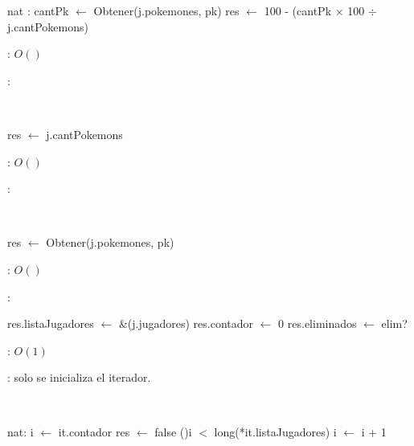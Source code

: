 \begin{Algoritmos}
	\begin{algorithm}[H]
		\NoCaptionOfAlgo
		\caption{}
		nat : cantPk $\leftarrow$ Obtener(j.pokemones, pk)\;
		res $\leftarrow$ 100 - (cantPk $\times$ 100 $\div$ j.cantPokemons)\;
	\end{algorithm}

	\complejidad: $O()$

	\justifcomp:

	~

	\begin{algorithm}[H]
		\NoCaptionOfAlgo
		\caption{}
		res $\leftarrow$ j.cantPokemons\;
	\end{algorithm}

	\complejidad: $O()$

	\justifcomp:

	~

	\begin{algorithm}[H]
		\NoCaptionOfAlgo
		\caption{}
		res $\leftarrow$ Obtener(j.pokemones, pk)\; 
	\end{algorithm}

	\complejidad: $O()$

	\justifcomp:



	\begin{algorithm}[H]
		\NoCaptionOfAlgo
		\caption{}
		res.listaJugadores $\leftarrow$ \&(j.jugadores)
		res.contador $\leftarrow$ 0
		res.eliminados $\leftarrow$ elim?
	\end{algorithm}

	\complejidad: $O(1)$

	\justifcomp: solo se inicializa el iterador.

	~

	\begin{algorithm}[H]
		\NoCaptionOfAlgo
		\caption{}
		nat: i $\leftarrow$ it.contador
		res $\leftarrow$ false
		\While(){i $<$ long(*it.listaJugadores)}{
			i $\leftarrow$ i + 1
		}
	\end{algorithm}


\end{Algoritmos}
